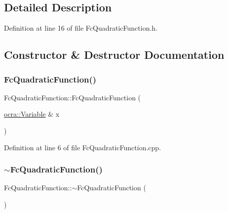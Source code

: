 \subsection{Detailed Description}


Definition at line 16 of file Fc\+Quadratic\+Function.\+h.



\subsection{Constructor \& Destructor Documentation}
\hypertarget{classocra_1_1FcQuadraticFunction_a85ee0d84a43b16353b1d44740cc3769b}{}\label{classocra_1_1FcQuadraticFunction_a85ee0d84a43b16353b1d44740cc3769b} 
\subsubsection{\texorpdfstring{Fc\+Quadratic\+Function()}{FcQuadraticFunction()}}
{\footnotesize\ttfamily Fc\+Quadratic\+Function\+::\+Fc\+Quadratic\+Function (\begin{DoxyParamCaption}\item[{\hyperlink{classocra_1_1Variable}{ocra\+::\+Variable} \&}]{x }\end{DoxyParamCaption})}



Definition at line 6 of file Fc\+Quadratic\+Function.\+cpp.

\hypertarget{classocra_1_1FcQuadraticFunction_a1eef85d7638d6bfc0c2bb3bc9dab8d63}{}\label{classocra_1_1FcQuadraticFunction_a1eef85d7638d6bfc0c2bb3bc9dab8d63} 
\subsubsection{\texorpdfstring{$\sim$\+Fc\+Quadratic\+Function()}{~FcQuadraticFunction()}}
{\footnotesize\ttfamily Fc\+Quadratic\+Function\+::$\sim$\+Fc\+Quadratic\+Function (\begin{DoxyParamCaption}{ }\end{DoxyParamCaption})\hspace{0.3cm}{\ttfamily [virtual]}}



